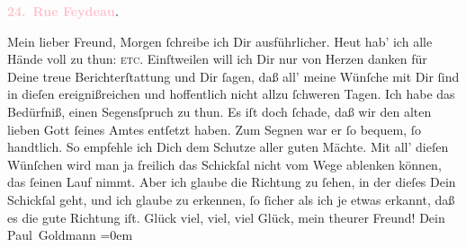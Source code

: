            \pstart
           \begin{otherlanguage}{french}\textcolor{gray}{\textbf{\textbf{\textcolor{pink}{24. Rue Feydeau}{}\ledrightnote{\textcolor{pink}{rue Feydeau}}.}}}\end{otherlanguage}\pend
           \pstart\center{}Mein lieber Freund,\pend\pstart
           Morgen ſchreibe ich Dir ausführlicher. Heut hab’ ich alle Hände voll zu thun: \label{K_L02749-1v}\label{K_L02749-1h}{ }\textsc{etc}. Einſtweilen
               will ich Dir nur von Herzen danken für Deine treue Berichterſtattung und Dir ſagen,
               daß all’ meine Wünſche mit Dir ſind in dieſen {\pb}ereignißreichen und hoffentlich nicht allzu ſchweren Tagen. Ich habe das Bedürfniß,
               einen Segensſpruch zu thun. Es iſt doch ſchade, daß \strikeout{\textcolor{gray}{w}} wir den alten lieben Gott ſeines  Amtes entſetzt haben. Zum Segnen war er ſo
               bequem, ſo handtlich. So empfehle ich Dich dem Schutze aller guten Mächte. Mit all’
               dieſen Wünſchen wird man ja freilich {\pb}das Schickſal
               nicht vom Wege ablenken können, das ſeinen Lauf nimmt. Aber ich glaube die Richtung
               zu ſehen, in der dieſes Dein Schickſal geht, und ich glaube zu erkennen, ſo ſicher
               als ich je etwas erkannt, daß es die gute Richtung iſt.\pend
           \pstart
           Glück viel, viel, viel Glück, mein theurer Freund!\pend
           \pstart
           Dein {\\[\baselineskip]}\spacefill\mbox{Paul Goldmann}\pend
           \leftskip=0em{}\endnumbering{}\begin{anhang}\end{anhang}
      